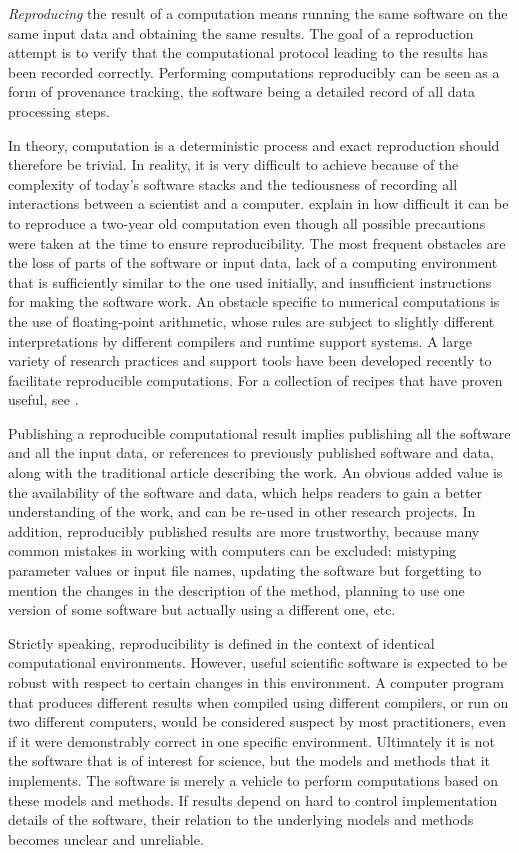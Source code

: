 \documentclass[a4paper,10pt, twocolumn]{article}
\begin{document}
\textit{Reproducing} the result of a computation means running the
same software on the same input data and obtaining the same results.
The goal of a reproduction attempt is to verify that the computational
protocol leading to the results has been recorded correctly.
Performing computations reproducibly can be seen as a form of
provenance tracking, the software being a detailed record of all data
processing steps.

In theory, computation is a deterministic process and exact
reproduction should therefore be trivial. In reality, it is very
difficult to achieve because of the complexity of today's software
stacks and the tediousness of recording all interactions between a
scientist and a computer.  \citeauthor{Mesnard:2016} explain in
\citep{Mesnard:2016} how difficult it can be to reproduce a two-year
old computation even though all possible precautions were taken at the
time to ensure reproducibility.  The most frequent obstacles are the
loss of parts of the software or input data, lack of a computing
environment that is sufficiently similar to the one used initially,
and insufficient instructions for making the software work. An
obstacle specific to numerical computations is the use of
floating-point arithmetic, whose rules are subject to slightly
different interpretations by different compilers and runtime support
systems. A large variety of research practices and support tools have
been developed recently to facilitate reproducible computations. For a
collection of recipes that have proven useful, see
\citep{kitzes:2017}.

Publishing a reproducible computational result implies publishing all
the software and all the input data, or references to previously
published software and data, along with the traditional article
describing the work. An obvious added value is the availability of the
software and data, which helps readers to gain a better understanding
of the work, and can be re-used in other research projects. In
addition, reproducibly published results are more trustworthy, because
many common mistakes in working with computers can be excluded:
mistyping parameter values or input file names, updating the software
but forgetting to mention the changes in the description of the
method, planning to use one version of some software but actually
using a different one, etc.

Strictly speaking, reproducibility is defined in the context of
identical computational environments. However, useful scientific
software is expected to be robust with respect to certain changes in
this environment. A computer program that produces different results
when compiled using different compilers, or run on two different
computers, would be considered suspect by most practitioners, even if
it were demonstrably correct in one specific environment. Ultimately
it is not the software that is of interest for science, but the models
and methods that it implements. The software is merely a vehicle to
perform computations based on these models and methods. If results
depend on hard to control implementation details of the software,
their relation to the underlying models and methods becomes unclear
and unreliable.\\
\end{document}
